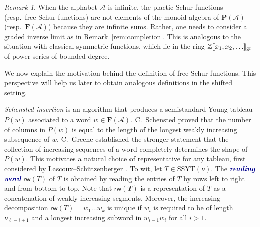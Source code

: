 \documentclass[12 pt]{amsart}
\newcommand{\newword}[1]{\textcolor{darkblue}{\textbf{\emph{#1}}}}
\newcommand{\Z}{\mathbb{Z}}
\newcommand{\Plactic}{{\mathbf{P}}}
\newcommand{\Free}{\mathbf{F}}
\newcommand{\PlacticSchur}{\mathcal{S}}
\newcommand{\FreeSchur}{\widehat{\mathcal{S}}}
\newcommand{\sPlacticSchur}{\mathcal{P}}
\newcommand{\sFreeSchur}{\widehat{\mathcal{P}}}
\newcommand{\reading}{\mathsf{rw}}
\newcommand{\cA}{\mathcal{A}}
\newcommand{\SSYT}{\mathrm{SSYT}}
\theoremstyle{remark}
\newtheorem{remark}[thm]{Remark}
\numberwithin{equation}{section}
\begin{document}


\begin{remark}
    When the alphabet $\cA$ is infinite, the plactic Schur functions (resp.\ free Schur functions) are not elements of the monoid algebra of $\Plactic(\cA)$ (resp.\ $\Free(\cA)$) because they are infinite sums. Rather, one needs to consider a graded inverse limit as in Remark~\ref{rem:completion}. This is analogous to the situation with classical symmetric functions, which lie in the ring $\Z \llbracket x_1, x_2, \dots \rrbracket_{\rm gr}$ of power series of bounded degree.
\end{remark}

We now explain the motivation behind the definition of free Schur functions. This perspective will help us later to obtain analogous definitions in the shifted setting. 

\emph{Schensted insertion} \cite{Schensted} is an algorithm that produces a semistandard Young tableau $P(w)$ associated to a word $w \in \Free(\cA)$.
C.~Schensted \cite{Schensted} proved that 
    the number of columns in $P(w)$ is equal to the length of the longest weakly increasing subsequence of $w.$
C.~Greene \cite{Greene} established the stronger statement that the collection of increasing sequences of a word completely determines the shape of $P(w)$. This motivates a natural choice of representative for any tableau, first considered by Lascoux--Sch\"{u}tzenberger \cite{Lascoux.Schutzenberger:plaxique}. To wit, let $T \in \SSYT(\nu)$. The \newword{reading word} $\reading(T)$ of $T$ is obtained by reading the entries of $T$ by rows left to right and from bottom to top. Note that $\reading(T)$ is a representation of $T$ as a concatenation of weakly increasing segments. Moreover, the increasing decomposition $\reading(T)=w_1\ldots w_k$ is unique if $w_i$ is required to be of length $\nu_{\ell-i+1}$ and a longest increasing subword in $w_{i-1}w_i$ for all $i>1.$
\end{document}
